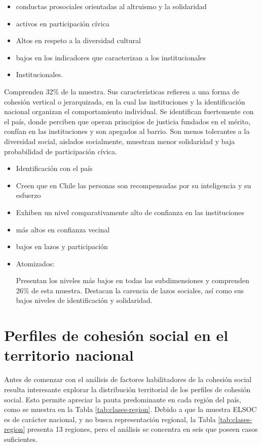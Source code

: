 \documentclass[
  12pt,
]{book}
\begin{document}
\begin{itemize}
\item
  conductas prosociales orientadas al altruismo y la solidaridad
\item
  activos en participación cívica
\item
  Altos en respeto a la diversidad cultural
\item
  bajos en los indicadores que caracterizan a los institucionales
\item
  Institucionales.
\end{itemize}

Comprenden 32\% de la muestra. Sus características refieren a una forma de cohesión vertical o jerarquizada, en la cual las instituciones y la identificación nacional organizan el comportamiento individual. Se identifican fuertemente con el país, donde perciben que operan principios de justicia fundados en el mérito, confían en las instituciones y son apegados al barrio. Son menos tolerantes a la diversidad social, aislados socialmente, muestran menor solidaridad y baja probabilidad de participación cívica.

\begin{itemize}
\item
  Identificación con el país
\item
  Creen que en Chile las personas son recompensadas por su inteligencia y su esfuerzo
\item
  Exhiben un nivel comparativamente alto de confianza en las instituciones
\item
  más altos en confianza vecinal
\item
  bajos en lazos y participación
\item
  Atomizados:

  Presentan los niveles más bajos en todas las subdimensiones y comprenden 26\% de esta muestra. Destacan la carencia de lazos sociales, así como sus bajos niveles de identificación y solidaridad.
\end{itemize}

\hypertarget{perfiles-de-cohesiuxf3n-social-en-el-territorio-nacional}{%
\section{Perfiles de cohesión social en el territorio nacional}\label{perfiles-de-cohesiuxf3n-social-en-el-territorio-nacional}}

Antes de comenzar con el análisis de factores habilitadores de la cohesión social resulta interesante explorar la distribución territorial de los perfiles de cohesión social. Esto permite apreciar la pauta predominante en cada región del país, como se muestra en la Tabla \ref{tab:clases-region}. Debido a que la muestra ELSOC es de carácter nacional, y no busca representación regional, la Tabla \ref{tab:clases-region} presenta 13 regiones, pero el análisis se concentra en seis que poseen casos suficientes.
\end{document}
